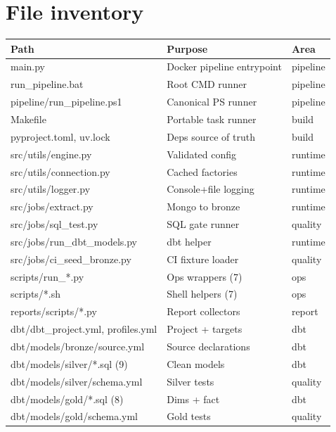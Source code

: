 \chapter{File inventory}

\begin{center}
\begin{longtable}{>{\ttfamily\scriptsize\raggedright\arraybackslash}p{5.2cm} >{\sffamily\scriptsize\raggedright\arraybackslash}p{6.4cm} >{\sffamily\scriptsize}l}
\toprule
Path & Purpose & Area \\
\midrule
\endhead
\bottomrule
\endfoot
main.py & Docker pipeline entrypoint & pipeline \\
run\_pipeline.bat & Root CMD runner & pipeline \\
pipeline/run\_pipeline.ps1 & Canonical PS runner & pipeline \\
Makefile & Portable task runner & build \\
pyproject.toml, uv.lock & Deps source of truth & build \\
src/utils/engine.py & Validated config & runtime \\
src/utils/connection.py & Cached factories & runtime \\
src/utils/logger.py & Console+file logging & runtime \\
src/jobs/extract.py & Mongo to bronze & runtime \\
src/jobs/sql\_test.py & SQL gate runner & quality \\
src/jobs/run\_dbt\_models.py & dbt helper & runtime \\
src/jobs/ci\_seed\_bronze.py & CI fixture loader & quality \\
scripts/run\_*.py & Ops wrappers (7) & ops \\
scripts/*.sh & Shell helpers (7) & ops \\
reports/scripts/*.py & Report collectors & report \\
dbt/dbt\_project.yml, profiles.yml & Project + targets & dbt \\
dbt/models/bronze/source.yml & Source declarations & dbt \\
dbt/models/silver/*.sql (9) & Clean models & dbt \\
dbt/models/silver/schema.yml & Silver tests & quality \\
dbt/models/gold/*.sql (8) & Dims + fact & dbt \\
dbt/models/gold/schema.yml & Gold tests & quality \\

\end{longtable}
\end{center}
